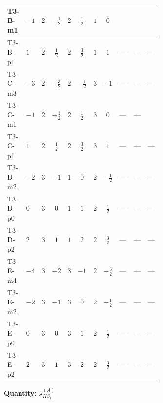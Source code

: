 \documentclass[8pt]{article}
\begin{document}
\begin{landscape}
\begin{longtable}{@{}llcccccc >{\raggedright\arraybackslash}p{0.21\linewidth} >{\raggedright\arraybackslash}p{0.21\linewidth} >{\raggedright\arraybackslash}p{0.21\linewidth}@{}}
T3-B-m1 & $-1$ & $2$ & $-\frac{1}{2}$ & $2$ & $\frac{1}{2}$ & $1$ & $0$ & \scriptsize\adjustbox{max width=\linewidth}{$\begin{gathered} +{\lambda_{H H^\dagger S_1^\dagger S_2^\dagger}^{\rm Cross}} \left(-\frac{2}{3} \operatorname{Tr}\!\left({y_1}\,\left({y_2}\right)^{\dagger}\right)-\frac{4}{3} (2 \left({\lambda_{H H^\dagger S_1^\dagger S_2^\dagger}^{\rm Cross}}\right)^{*}+\left({\lambda_{11}}\right)^{*})\right)\end{gathered}$} & \scriptsize\adjustbox{max width=\linewidth}{$\begin{gathered} -\frac{2}{3} \left({\lambda_{H H^\dagger S_1^\dagger S_2^\dagger}^{\rm Cross}}\right)^{*} \operatorname{Tr}\!\left({y_2}\,\left({y_1}\right)^{\dagger}\right)\end{gathered}$} & \scriptsize\adjustbox{max width=\linewidth}{$\begin{gathered} +\frac{64}{3} {\lambda_{7}} \left({\lambda_{7}}\right)^{*}\end{gathered}$} \\
\midrule
T3-B-p1 & $1$ & $2$ & $\frac{1}{2}$ & $2$ & $\frac{3}{2}$ & $1$ & $1$ & --- & --- & --- \\
\midrule
T3-C-m3 & $-3$ & $2$ & $-\frac{3}{2}$ & $2$ & $-\frac{1}{2}$ & $3$ & $-1$ & --- & --- & --- \\
\midrule
T3-C-m1 & $-1$ & $2$ & $-\frac{1}{2}$ & $2$ & $\frac{1}{2}$ & $3$ & $0$ & --- & --- & \scriptsize\adjustbox{max width=\linewidth}{$\begin{gathered} +\frac{64}{3} {\lambda_{7}} \left({\lambda_{7}}\right)^{*}\end{gathered}$} \\
\midrule
T3-C-p1 & $1$ & $2$ & $\frac{1}{2}$ & $2$ & $\frac{3}{2}$ & $3$ & $1$ & --- & --- & --- \\
\midrule
T3-D-m2 & $-2$ & $3$ & $-1$ & $1$ & $0$ & $2$ & $-\frac{1}{2}$ & --- & --- & --- \\
\midrule
T3-D-p0 & $0$ & $3$ & $0$ & $1$ & $1$ & $2$ & $\frac{1}{2}$ & --- & --- & --- \\
\midrule
T3-D-p2 & $2$ & $3$ & $1$ & $1$ & $2$ & $2$ & $\frac{3}{2}$ & --- & --- & --- \\
\midrule
T3-E-m4 & $-4$ & $3$ & $-2$ & $3$ & $-1$ & $2$ & $-\frac{3}{2}$ & --- & --- & --- \\
\midrule
T3-E-m2 & $-2$ & $3$ & $-1$ & $3$ & $0$ & $2$ & $-\frac{1}{2}$ & --- & --- & --- \\
\midrule
T3-E-p0 & $0$ & $3$ & $0$ & $3$ & $1$ & $2$ & $\frac{1}{2}$ & --- & --- & --- \\
\midrule
T3-E-p2 & $2$ & $3$ & $1$ & $3$ & $2$ & $2$ & $\frac{3}{2}$ & --- & --- & --- \\
\midrule
\bottomrule
\end{longtable}
\clearpage
\noindent\textbf{Quantity: }$\lambda_{HS_1}^{(A)}$\par\smallskip

\end{landscape}
\end{document}
